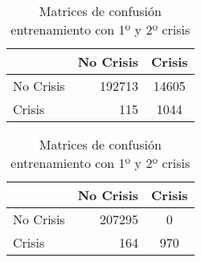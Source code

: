 \begin{table}
\begin{center}
        \begin{subtable}[c]{0.4\textwidth}
            \begin{tabular}{lrc}
                \hline
                 & No Crisis & Crisis \\
                \hline
                No Crisis & 192713 & 14605 \\
                Crisis & 115 & 1044\\
                \hline
            \end{tabular}
            \label{tab:mat-conf-raw-1.6}
        \end{subtable}
        \hspace{1em}\vspace{1em}
        \begin{subtable}[c]{0.4\textwidth}
                \begin{tabular}{lrc}
                \hline
                 & No Crisis & Crisis \\
                \hline
                No Crisis & 207295 & 0 \\
                Crisis & 164 & 970\\
                \hline
            \end{tabular}
            \label{tab:mat-conf-stats-1.6}
        \end{subtable}
        \caption{Matrices de confusión entrenamiento con 1º y 2º crisis}
        \label{tab:matriz-conf-1a-2d}
    \end{center}
\end{table}
